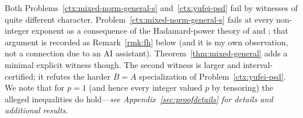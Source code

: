 \begin{cxrefutation}
Both Problems~\ref{ctx:mixed-norm-general-s} and~\ref{ctx:yufei-psd} fail by witnesses of quite different character. Problem~\ref{ctx:mixed-norm-general-s} fails at every non-integer exponent as a consequence of the Hadamard-power theory of \citet{FitzGeraldHorn1977} and \citet[Theorem~4.3]{HornMathias1990}; that argument is recorded as Remark~\ref{rmk:fh} below (and it is my own observation, not a connection due to an AI assistant).  Theorem~\ref{thm:mixed-general} adds a minimal explicit witness though. The second witness is larger and interval-certified; it refutes the harder $B=A$ specialization of Problem~\ref{ctx:yufei-psd}. We note that for $p=1$ (and hence every integer valued $p$ by tensoring) the alleged inequalities do hold---\emph{see Appendix~\ref{sec:proofdetails} for details and additional results}.


\end{cxrefutation}
